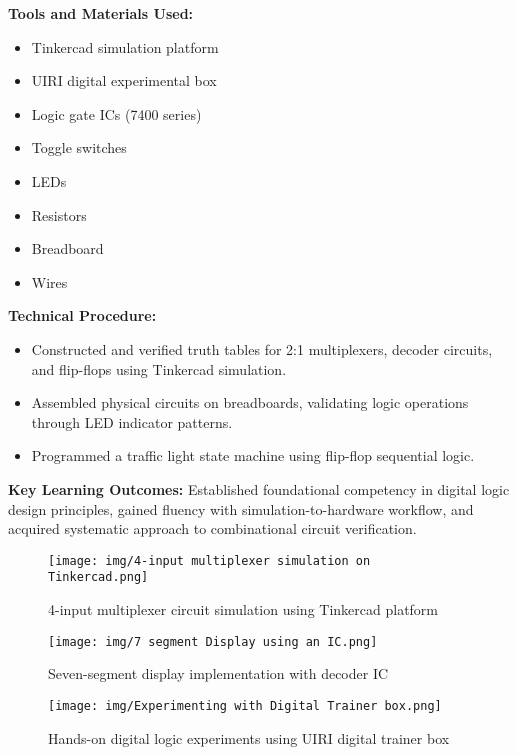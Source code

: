 \documentclass[12pt,a4paper]{report}
\begin{document}
\noindent\textbf{Tools and Materials Used:}
\begin{multicols}{2}
\begin{itemize}
    \item Tinkercad simulation platform
    \item UIRI digital experimental box
    \item Logic gate ICs (7400 series)
    \item Toggle switches
    \item LEDs
    \item Resistors
    \item Breadboard
    \item Wires
\end{itemize}
\end{multicols}

\noindent\textbf{Technical Procedure:}
\begin{itemize}
    \item Constructed and verified truth tables for 2:1 multiplexers, decoder circuits, and flip-flops using Tinkercad simulation.
    \item Assembled physical circuits on breadboards, validating logic operations through LED indicator patterns.
    \item Programmed a traffic light state machine using flip-flop sequential logic.
\end{itemize}

\noindent\textbf{Key Learning Outcomes:} Established foundational competency in digital logic design principles, gained fluency with simulation-to-hardware workflow, and acquired systematic approach to combinational circuit verification.

\begin{figure}[H]
\centering
\texttt{[image: img/4-input multiplexer simulation on Tinkercad.png]}
\caption{4-input multiplexer circuit simulation using Tinkercad platform}
\label{fig:multiplexer-sim}
\end{figure}

\begin{figure}[H]
\centering
\texttt{[image: img/7 segment Display using an IC.png]}
\caption{Seven-segment display implementation with decoder IC}
\label{fig:7segment-display}
\end{figure}

\begin{figure}[H]
\centering
\texttt{[image: img/Experimenting with Digital Trainer box.png]}
\caption{Hands-on digital logic experiments using UIRI digital trainer box}
\label{fig:digital-trainer}
\end{figure}
\end{document}
